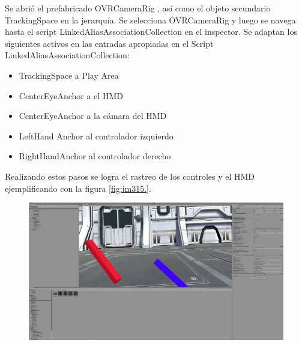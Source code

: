 Se abrió el prefabricado OVRCameraRig , así como el objeto secundario TrackingSpace en la jerarquía. Se selecciona OVRCameraRig y luego se navega hasta el script LinkedAliasAssociationCollection en el inspector. Se adaptan los siguientes activos en las entradas apropiadas en el Script LinkedAliasAssociationCollection:\\
\begin{itemize}
    \item TrackingSpace a Play Area
    \item CenterEyeAnchor a el HMD
    \item CenterEyeAnchor a la cámara del HMD
    \item LeftHand Anchor al controlador izquierdo
    \item RightHandAnchor al controlador derecho
\end{itemize}
Realizando estos pasos se logra el rastreo de los controles y el HMD ejemplificando con la figura \ref{fig:im315.}.
\begin{figure}[H]
	\begin{center}
 		\includegraphics[width = .7\textwidth]{source/images/image44.png}
	\end{center} 
\end{figure}

